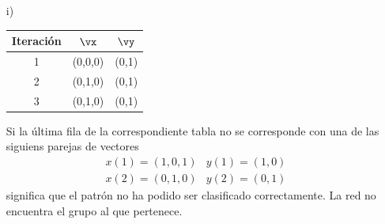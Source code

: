 \begin{problem}[10]
\begin{multicols}{2}
\begin{enumerate}
\item[i)]

\begin{tabular}{|ccc|}
\hline
\textbf{Iteración} & $\vx$ & $\vy$ \\
\hline
1 & (0,0,0) & (0,1) \\
\hline
2 & (0,1,0) & (0,1) \\
\hline
3 & (0,1,0) & (0,1) \\
\hline
\end{tabular}

Si la última fila de la correspondiente tabla no se corresponde con una de las siguiens parejas de vectores
\[\begin{array}{ll}
x(1)=(1,0,1) & y(1)=(1,0)\\
x(2) = (0,1,0) & y(2) = (0,1)
\end{array}\]
significa que el patrón no ha podido ser clasificado correctamente. La red no encuentra el grupo al que pertenece.

\end{enumerate}
\end{multicols}

\end{problem}

